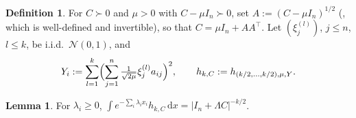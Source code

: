 \documentclass[14pt]{extarticle}
\theoremstyle{definition}
\newtheorem{lemma}[theorem]{Lemma}
\newtheorem{definition}[theorem]{Definition}
\newcommand{\dd}{\mathrm{d}}
\newcommand{\caln}{\mathcal{N}}
\begin{document}
\begin{definition}\label{def:hkC}
  For $C\succ 0$ and $\mu>0$ with $C-\mu I_n\succ 0$, set
  $A:=(C-\mu I_n)^{1/2}$ (, which is well-defined and
  invertible), so that $C=\mu I_n+AA^\top$.  Let $(\xi_j^{(l)})$,
  $j\leqslant n$, $l\leqslant k$, be i.i.d.\ $\caln(0,1)$, and
  \begin{equation}\label{eq:defhkC}
    Y_i:=\sum_{l=1}^k\Bigl(\sum_{j=1}^n
      \tfrac{1}{\sqrt{2\mu}}\xi_j^{(l)}a_{ij}\Bigr)^2,
    \qquad
    h_{k,C}:=h_{(k/2,\ldots,k/2),\mu,Y}.
  \end{equation}
\end{definition}

\begin{lemma}\label{lem:LaplhkC}
  For $\lambda_i\geqslant 0$,
  $\int e^{-\sum_i\lambda_ix_i}h_{k,C}\,\dd x
  =|I_n+\Lambda C|^{-k/2}$.
\end{lemma}
\end{document}
